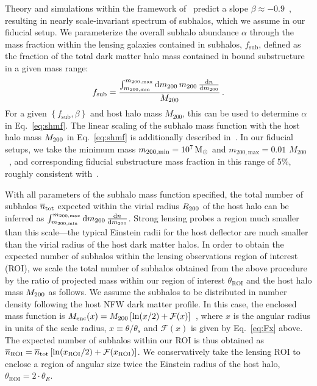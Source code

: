 \documentclass[twocolumn]{aastex62}
\begin{document}
Theory and simulations within the framework of \lcdm~predict a slope $\beta\approx-0.9$~\citep{0809.0898,0802.2265}, resulting in nearly scale-invariant spectrum of subhalos, which we assume in our fiducial setup.
We parameterize the overall subhalo abundance $\alpha$ through the mass fraction within the lensing galaxies contained in subhalos, $f_\mathrm{sub}$, defined as the fraction of the total dark matter halo mass contained in bound substructure in a given mass range:
\begin{equation}
f_\mathrm{sub} = \frac{\int_{m_\mathrm{200, min}}^{m_\mathrm{200, max}}\diff \mtwo\,\mtwo\,\frac{\diff n}{\diff \mtwo}}{M_\mathrm{200}} \,.
\end{equation}
For a given $\left\{f_\mathrm{sub},\beta\right\}$ and host halo mass $M_\mathrm{200}$, this can be used to determine $\alpha$ in Eq.~\eqref{eq:shmf}. The linear scaling of the subhalo mass function with the host halo mass $M_{200}$ in Eq.~\eqref{eq:shmf} is additionally described in~\citet{2016MNRAS.457.1208H,2017MNRAS.469.1997D}. In our fiducial setups, we take the minimum mass $m_\mathrm{200, min} = 10^7\,\textrm{M}_\odot$ and $m_\mathrm{200, max} = 0.01\,\,M_\mathrm{200}$~\citep{2017MNRAS.469.1997D,2018PhRvD..97l3002H}, and corresponding fiducial substructure mass fraction in this range of 5\%, roughly consistent with~\citet{2018PhRvD..97l3002H,2019arXiv190504182H,2002ApJ...572...25D}.

With all parameters of the subhalo mass function specified, the total number of subhalos $\mean{n}_{\mathrm{tot}}$ expected within the virial radius $R_{200}$ of the host halo can be inferred as $\int_{m_\mathrm{200, min}}^{m_\mathrm{200, max}}\mathrm{d} m_{200}\,\frac{\mathrm{d} n}{\mathrm{d} m_{200}}$. Strong lensing probes a region much smaller than this scale---the typical Einstein radii for the host deflector are much smaller than the virial radius of the host dark matter halos. In order to obtain the expected number of subhalos within the lensing observations region of interest (ROI), we scale the total number of subhalos obtained from the above procedure by the ratio of projected mass within our region of interest $\theta_\textrm{ROI}$ and the host halo mass $M_{200}$ as follows. We assume the subhalos to be distributed in number density following the host NFW dark matter profile. In this case, the enclosed mass function is $M_\mathrm{enc}(x) = M_{200}\left[\ln(x/2) + \mathcal{F}(x)\right]$~\citep{2001astro.ph..2341K}, where $x$ is the angular radius in units of the scale radius, $x\equiv \theta/\theta_s$ and $\mathcal{F}(x)$ is given by Eq.~\eqref{eq:Fx} above. The expected number of subhalos within our ROI is thus obtained as $\mean n_\mathrm{ROI} = \mean n_\mathrm{tot}\left[\ln(x_\mathrm{ROI}/2) + \mathcal{F}(x_\mathrm{ROI})\right]$. We conservatively take the lensing ROI to enclose a region of angular size twice the Einstein radius of the host halo, $\theta_\mathrm{ROI} = 2\cdot\theta_E$.
\end{document}
